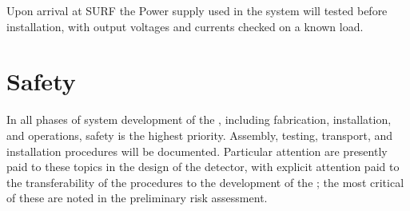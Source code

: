 Upon arrival at SURF the Power supply used in the  \hv system will tested before installation, with  output voltages and currents checked on a known load. 





\section{Safety}
\label{sec:fddp-hv-safety}



%

%

In all phases of \hv system development of the \dpmod, including fabrication, installation, and operations, safety is the highest priority.  Assembly, testing, transport, and installation procedures will be documented. Particular attention are presently paid to these topics in the design of the  detector, with explicit attention paid to the transferability of the procedures to the development of the \dpmod; the most critical of these are noted in the preliminary  risk assessment. 

